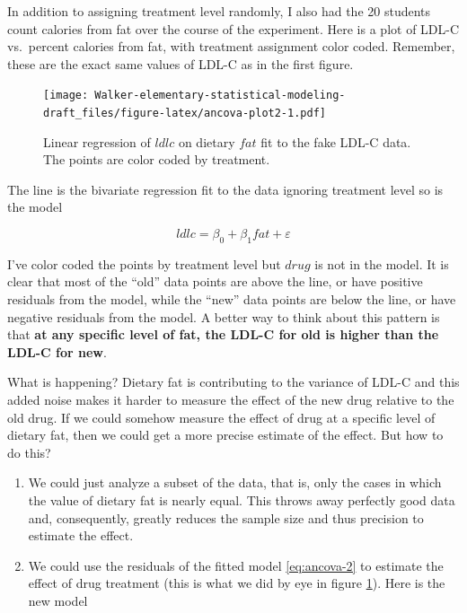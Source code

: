 \documentclass[]{book}
\begin{document}
In addition to assigning treatment level randomly, I also had the 20
students count calories from fat over the course of the experiment. Here
is a plot of LDL-C vs.~percent calories from fat, with treatment
assignment color coded. Remember, these are the exact same values of
LDL-C as in the first figure.

\begin{figure}
\centering
\texttt{[image: Walker-elementary-statistical-modeling-draft\_files/figure-latex/ancova-plot2-1.pdf]}
\caption{\label{fig:ancova-plot2}Linear regression of \(ldlc\) on dietary
\(fat\) fit to the fake LDL-C data. The points are color coded by
treatment.}
\end{figure}

The line is the bivariate regression fit to the data ignoring treatment
level so is the model

\begin{equation}
ldlc = \beta_0 + \beta_1 fat + \varepsilon
\label{eq:ancova-2}
\end{equation}

I've color coded the points by treatment level but \(drug\) is not in
the model. It is clear that most of the ``old'' data points are above
the line, or have positive residuals from the model, while the ``new''
data points are below the line, or have negative residuals from the
model. A better way to think about this pattern is that \textbf{at any
specific level of fat, the LDL-C for old is higher than the LDL-C for
new}.

What is happening? Dietary fat is contributing to the variance of LDL-C
and this added noise makes it harder to measure the effect of the new
drug relative to the old drug. If we could somehow measure the effect of
drug at a specific level of dietary fat, then we could get a more
precise estimate of the effect. But how to do this?

\begin{enumerate}
\def\labelenumi{\arabic{enumi}.}
\item
  We could just analyze a subset of the data, that is, only the cases in
  which the value of dietary fat is nearly equal. This throws away
  perfectly good data and, consequently, greatly reduces the sample size
  and thus precision to estimate the effect.
\item
  We could use the residuals of the fitted model \eqref{eq:ancova-2} to
  estimate the effect of drug treatment (this is what we did by eye in
  figure \ref{fig:ancova-plot2}). Here is the new model
\end{enumerate}
\end{document}
